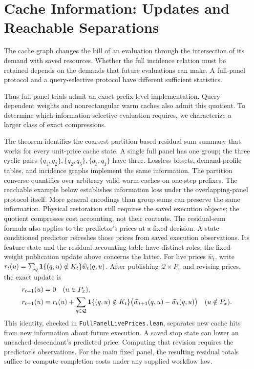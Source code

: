 \section{Cache Information: Updates and Reachable Separations}
\label{app:graph-information}
The cache graph changes the bill of an evaluation through the intersection of its demand with saved resources. Whether the full incidence relation must be retained depends on the demands that future evaluations can make. A full-panel protocol and a query-selective protocol have different sufficient statistics.


Thus full-panel trials admit an exact prefix-level implementation. Query-dependent weights and nonrectangular warm caches also admit this quotient. To determine which information selective evaluation requires, we characterize a larger class of exact compressions.



The theorem identifies the coarsest partition-based residual-sum summary that
works for every unit-price cache state. A single full panel has one group;
the three cyclic pairs $\{q_1,q_2\},\{q_2,q_3\},\{q_3,q_1\}$ have three.
Lossless bitsets, demand-profile tables, and incidence graphs implement the
same information. The partition converse quantifies over arbitrary valid warm caches on
one-step prefixes. The reachable example below establishes information loss
under the overlapping-panel protocol itself. More general encodings than group
sums can preserve the same information.
Physical restoration still requires the saved execution objects; the quotient
compresses cost accounting, not their contents.
The residual-sum formula also applies to the predictor's prices at a fixed
decision. A state-conditioned predictor refreshes those prices from saved
execution observations. Its feature state and the residual accounting table
have distinct roles; the fixed-weight publication update above concerns the latter.
For live prices $\widehat w_t$, write
$r_t(u)=\sum_q\mathbf{1}\{(q,u)\notin K_t\}\widehat w_t(q,u)$.
After publishing $\mathcal Q\times P_x$ and revising prices, the exact update is
\begin{equation}
\begin{split}
 r_{t+1}(u)&=0 \quad (u\in P_x),\\
 r_{t+1}(u)&=r_t(u)+\sum_{q\in\mathcal Q}\mathbf{1}\{(q,u)\notin K_t\}
       \bigl(\widehat w_{t+1}(q,u)-\widehat w_t(q,u)\bigr)
       \quad (u\notin P_x).
\end{split}
\label{eq:live-residual-update}
\end{equation}
This identity, checked in \texttt{FullPanelLivePrices.lean}, separates new
cache hits from new information about future execution. A saved stop state
can lower an uncached descendant's predicted price. Computing that revision
requires the predictor's observations. For the main fixed panel, the resulting
residual totals suffice to compute completion costs under any supplied workflow law.

